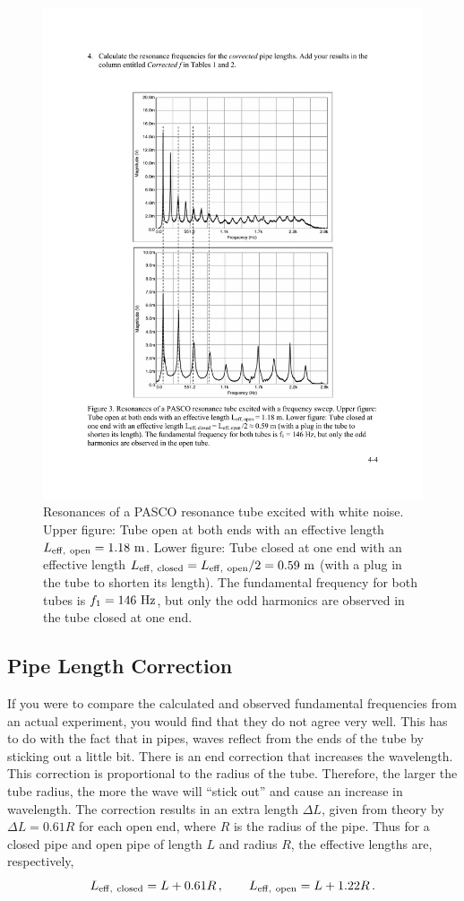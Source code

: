 \documentclass[11pt]{NSF}
\def\be{\begin{equation}}
\def\ee{\end{equation}}
\begin{document}
\begin{figure}[hbtp]
\begin{center}
\includegraphics[width=.7\textwidth]{fig4_3}
\caption{Resonances of a PASCO resonance tube excited with white noise.
Upper figure: Tube open at both ends with an effective length 
$L_{\rm eff,\ open} = 1.18~{\rm m}$.
Lower figure: Tube closed at one end with an effective length 
$L_{\rm eff,\ closed} = L_{\rm eff,\ open}/2 = 0.59~{\rm m}$ 
(with a plug in the tube to shorten its length). 
The fundamental frequency for both tubes is $f_1 = 146~{\rm Hz}$, 
but only the odd harmonics are observed in the tube closed at one end.}
\label{f:3} 
\end{center} 
\end{figure}
%

\subsection{Pipe Length Correction}

If you were to compare the calculated and observed
fundamental frequencies from an actual experiment,
you would find that they do not agree very well.
This has to do with the fact that in pipes, waves 
reflect from the ends of the tube by sticking out a little bit. 
There is an end correction that increases the wavelength. 
This correction is proportional to the radius of the tube. 
Therefore, the larger the tube radius, the more the wave 
will ``stick out” and cause an increase in wavelength. 
The correction results in an extra length $\Delta L$, 
given from theory by $\Delta L = 0.61 R$ for each open end, 
where $R$ is the radius of the pipe. 
Thus for a closed pipe and open pipe of length $L$ and 
radius $R$, the effective lengths are, respectively,
%
\be
L_{\rm eff,\ closed} = L + 0.61 R\,,
\qquad
L_{\rm eff,\ open} = L + 1.22 R\,.
\ee
\end{document}
